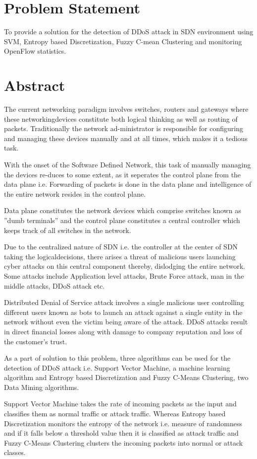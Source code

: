 \documentclass[12pt,a4paper,final]{report}
\begin{document}
\section{Problem Statement}
To provide a solution for the detection of DDoS attack in SDN environment
using SVM, Entropy based Discretization, Fuzzy C-mean Clustering and monitoring OpenFlow statistics.

\section{Abstract}
The current networking paradigm involves switches, routers and gateways where these networkingdevices constitute both logical thinking as well as routing of packets. Traditionally the network ad-ministrator is responsible for configuring and managing these devices manually and at all times, which makes it a tedious task.

With the onset of the Software Defined Network, this task of manually managing the devices re-duces to some extent, as it seperates the control plane from the data plane i.e. Forwarding of packets is done in the data plane and intelligence of the entire network resides in the control plane.

Data plane constitutes the network devices which comprise switches known as ”dumb terminals” and the control plane constitutes a central controller which keeps track of all switches in the network.

Due to the centralized nature of SDN i.e. the controller at the center of SDN taking the logicaldecisions, there arises a threat of malicious users launching cyber attacks on this central component thereby, dislodging the entire network. Some attacks include Application level attacks, Brute Force attack, man in the middle attacks, DDoS attack etc.

Distributed Denial of Service attack involves a single malicious user controlling different users known as bots to launch an attack against a single entity in the network without even the victim being aware of the attack. DDoS attacks result in direct financial losses along with damage to company reputation and loss of the customer’s trust.

As a part of solution to this problem, three algorithms can be used for the detection of DDoS attack i.e. Support Vector Machine, a machine learning algorithm and Entropy based Discretization and Fuzzy C-Means Clustering, two Data Mining algorithms.

Support Vector Machine takes the rate of incoming packets as the input and classifies them as normal traffic or attack traffic. Whereas Entropy based Discretization monitors the entropy of the network i.e. measure of randomness and if it falls below a threshold value then it is classified as attack traffic and Fuzzy C-Means Clustering clusters the incoming packets into normal or attack classes.
\end{document}
